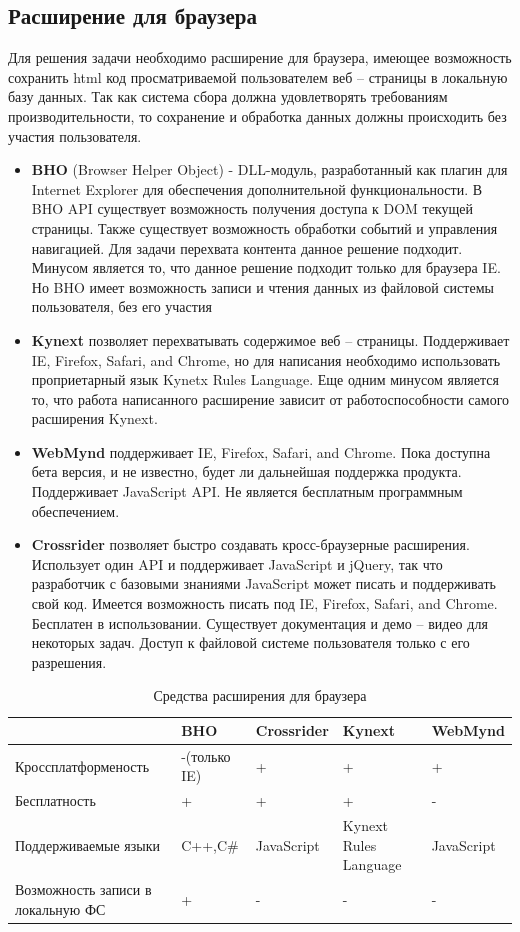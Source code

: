 \documentclass[russian, utf8, emptystyle]{eskdtext}
\begin{document}
\subsection{Расширение для браузера}
Для решения задачи необходимо расширение для браузера, имеющее возможность сохранить html код просматриваемой пользователем веб – страницы в локальную базу данных. Так как система сбора должна удовлетворять требованиям производительности, то сохранение и обработка данных должны происходить без участия пользователя.
\begin{itemize}
	\item {\bf BHO} (Browser Helper Object) - DLL-модуль, разработанный как плагин для Internet Explorer для обеспечения дополнительной функциональности. В BHO API существует возможность получения доступа к DOM текущей страницы. Также существует возможность обработки событий и управления навигацией. Для задачи перехвата контента данное решение подходит. Минусом является то, что данное решение подходит только для браузера IE. Но BHO имеет возможность записи и чтения данных из файловой системы пользователя, без его участия
	\item {\bf Kynext} позволяет перехватывать содержимое веб – страницы. Поддерживает IE, Firefox, Safari, and Chrome, но для написания необходимо использовать проприетарный язык Kynetx Rules Language. Еще одним минусом является то, что работа написанного расширение зависит от работоспособности самого расширения Kynext.
	\item {\bf WebMynd} поддерживает  IE, Firefox, Safari, and Chrome. Пока доступна бета версия, и не известно, будет ли дальнейшая поддержка продукта. Поддерживает JavaScript API. Не является бесплатным программным обеспечением.
	\item {\bf Crossrider} позволяет быстро создавать кросс-браузерные расширения. Использует один API и поддерживает JavaScript и jQuery, так что разработчик с базовыми знаниями JavaScript может писать и поддерживать свой код. Имеется возможность писать под IE, Firefox, Safari, and Chrome. Бесплатен в использовании. Существует документация и демо – видео для некоторых задач. Доступ к файловой системе пользователя только с его разрешения. 
\end{itemize}
\begin{table} 
	\caption{Средства расширения для браузера}
	\label{tab:far}
	\begin{center}
		\begin{tabular}{|L{5cm}|L{2cm}|L{2cm}|L{2cm}|L{2cm}|}
			\hline
			& BHO & Crossrider & Kynext & WebMynd \\
			\hline     
			Кроссплатформеность  & -(только IE) & + & + & + \\
			\hline
			Бесплатность & + & + & + & -\\
			\hline
			Поддерживаемые языки & C++,C\# & JavaScript & Kynext Rules Language & JavaScript  \\
			\hline
			Возможность записи в локальную ФС & + & - & - &- \\
			\hline
		\end{tabular}
	\end{center}
\end{table}
\end{document}
